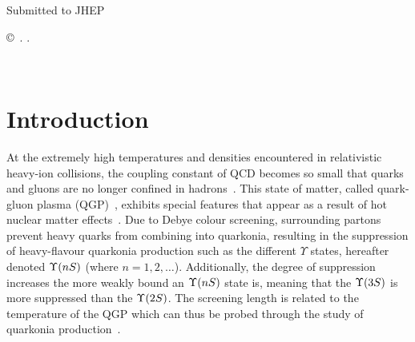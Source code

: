 \documentclass[12pt,a4paper]{article}
\def\paperlicenceurl{https://creativecommons.org/licenses/by/4.0/}
\def\PUpsilon    {\ensuremath{\Upsilon}\xspace}
\begin{document}
\begin{titlepage}
\begin{abstract}
  
\end{abstract}

\vspace*{2.0cm}

\begin{center}
 Submitted to JHEP 
\end{center}

\vspace{\fill}

{\footnotesize 
\centerline{\copyright~\papercopyright. \href{\paperlicenceurl}{\paperlicence}.}}
\vspace*{2mm}

\end{titlepage}




\newpage
\setcounter{page}{2}
\mbox{~}











 

\renewcommand{\thefootnote}{\arabic{footnote}}
\setcounter{footnote}{0}

\cleardoublepage




\pagestyle{plain} \setcounter{page}{1}


\section{Introduction}
\label{sec:Introduction}



At the extremely high temperatures and densities encountered in relativistic heavy-ion collisions, the coupling constant of QCD becomes so small that quarks and gluons are no longer confined in hadrons~\cite{Aoki:2006we,HotQCD:2018pds}. 
This state of matter, called quark-gluon plasma (QGP)~\cite{Shuryak:1978ij,Gross:1980br}, exhibits special features that appear as a result of hot nuclear matter effects~\cite{Adams_2005}. 
Due to Debye colour screening, surrounding partons prevent heavy quarks from combining into quarkonia\cite{Matsui:1986dk}, resulting in the suppression of heavy-flavour quarkonia production such as the different $\PUpsilon$ states, hereafter denoted $\Yn{n}$ (where $n=1, 2, \ldots$).  Additionally, the degree of  suppression increases the more weakly bound an $\Yn{n}$ state is, 
meaning that the $\Yn{3}$ is more suppressed than the $\Yn{2}$. The screening length is related to the temperature of the QGP which can thus be probed through the study of quarkonia production~\cite{Mocsy:2007jz}.
\end{document}
